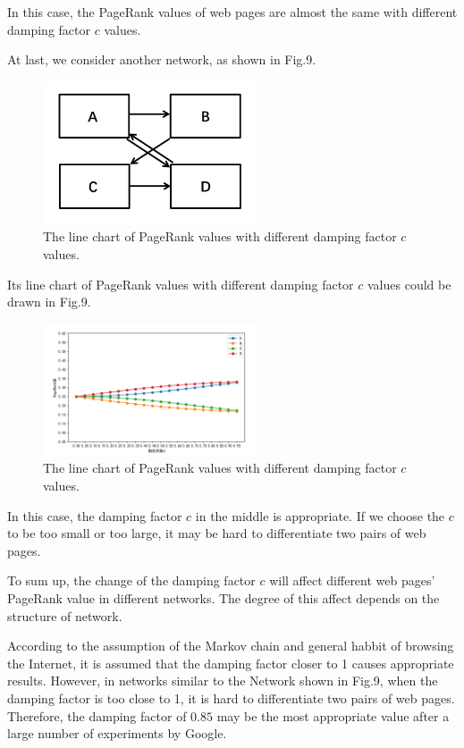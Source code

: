 \documentclass[lettersize,journal,12pt,conference]{IEEEtran}
\begin{document}
In this case, the PageRank values of web pages are almost the same with different damping factor $c$ values.

At last, we consider another network, as shown in Fig.9.

\begin{figure}[h]
	\centering
	\includegraphics[width=2.5in]{images/fig11.png}
	\caption{The line chart of PageRank values with different damping factor $c$ values.}
	\label{fig11}
\end{figure}

Its line chart of PageRank values with different damping factor $c$ values could be drawn in Fig.9.

\begin{figure}[h]
	\centering
	\includegraphics[width=2.5in]{images/fig12.png}
	\caption{The line chart of PageRank values with different damping factor $c$ values.}
	\label{fig12}
\end{figure}

In this case, the damping factor $c$ in the middle is appropriate. If we choose the $c$ to be too small or too large, it may be hard to differentiate two pairs of web pages.

To sum up, the change of the damping factor $c$ will affect different web pages' PageRank value in different networks. The degree of this affect depends on the structure of network.

According to the assumption of the Markov chain and general habbit of browsing the Internet, it is assumed that the damping factor closer to 1 causes appropriate results. However, in networks similar to the Network shown in Fig.9, when the damping factor is too close to 1, it is hard to differentiate two pairs of web pages. Therefore, the damping factor of $0.85$ may be the most appropriate value after a large number of experiments by Google.
\end{document}
